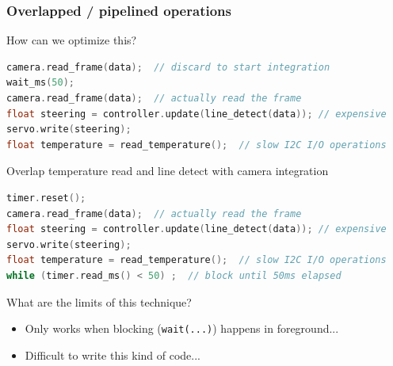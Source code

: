 \documentclass{beamer}
\begin{document}
\begin{frame}[fragile]
\frametitle{Overlapped / pipelined operations}
How can we optimize this?
\begin{lstlisting}[language=C++,basicstyle=\ttfamily\scriptsize]
camera.read_frame(data);  // discard to start integration
wait_ms(50);
camera.read_frame(data);  // actually read the frame
float steering = controller.update(line_detect(data)); // expensive
servo.write(steering);
float temperature = read_temperature();  // slow I2C I/O operations
\end{lstlisting}
\hfill \break
Overlap temperature read and line detect with camera integration
\begin{lstlisting}[language=C++,basicstyle=\ttfamily\scriptsize]
timer.reset();
camera.read_frame(data);  // actually read the frame
float steering = controller.update(line_detect(data)); // expensive
servo.write(steering);
float temperature = read_temperature();  // slow I2C I/O operations
while (timer.read_ms() < 50) ;  // block until 50ms elapsed
\end{lstlisting}

What are the limits of this technique?
 {\begin{itemize}
  \item Only works when blocking (\texttt{wait(...)}) happens in foreground... \\
  \item Difficult to write this kind of code...
\end{itemize}}
\end{frame}
\end{document}
